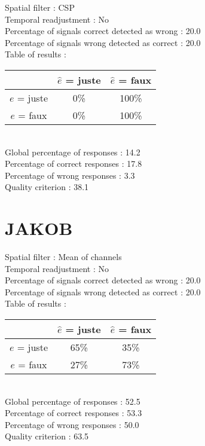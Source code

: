 Spatial filter : CSP \\
Temporal readjustment : No \\
Percentage of signals correct detected as wrong :   20.0 \\
Percentage of signals wrong detected as correct :   20.0 \\
Table of results : \\
\begin{tabular}{|c|c|c|}
\hline				& $\hat{e}$ = juste & $\hat{e}$ = faux \\
\hline  $e$ = juste	&      0\%			&    100\%		\\
\hline  $e$ = faux	&      0\%			&    100\%		\\
\hline
\end{tabular}\\
Global percentage of responses :   14.2 \\
Percentage of correct responses :   17.8 \\
Percentage of wrong responses :    3.3 \\
Quality criterion :   38.1 \\

\section*{JAKOB}
Spatial filter : Mean of channels \\
Temporal readjustment : No \\
Percentage of signals correct detected as wrong :   20.0 \\
Percentage of signals wrong detected as correct :   20.0 \\
Table of results : \\
\begin{tabular}{|c|c|c|}
\hline				& $\hat{e}$ = juste & $\hat{e}$ = faux \\
\hline  $e$ = juste	&     65\%			&     35\%		\\
\hline  $e$ = faux	&     27\%			&     73\%		\\
\hline
\end{tabular}\\
Global percentage of responses :   52.5 \\
Percentage of correct responses :   53.3 \\
Percentage of wrong responses :   50.0 \\
Quality criterion :   63.5 \\

